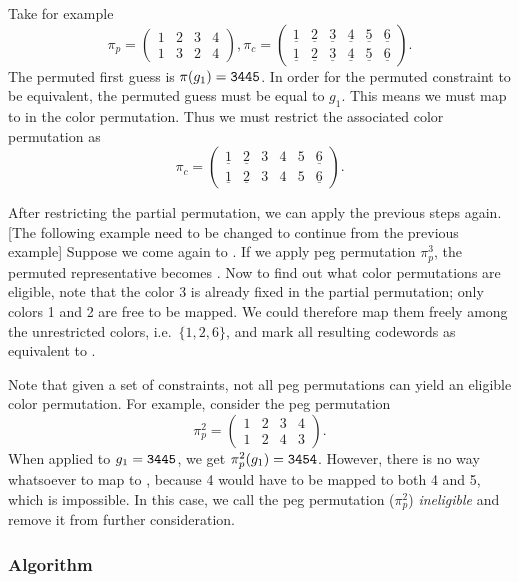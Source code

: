 Take for example 
\[
\pi_p = 
\begin{pmatrix}
1 & 2 & 3 & 4 \\
1 & 3 & 2 & 4
\end{pmatrix} , 
\pi_c = 
\begin{pmatrix}
\underline{1} & \underline{2} & \underline{3} & \underline{4} & \underline{5} & \underline{6} \\
\underline{1} & \underline{2} & \underline{3} & \underline{4} & \underline{5} & \underline{6} 
\end{pmatrix} .
\] 
The permuted first guess is $\pi(g_1) = \texttt{3445}$. In order for the permuted constraint to be equivalent, the permuted guess must be equal to $g_1$. This means we must map  to  in the color permutation. Thus we must restrict the associated color permutation as
\[
\pi_c = 
\begin{pmatrix}
\underline{1} & \underline{2} & 3 & 4 & 5 & \underline{6} \\
\underline{1} & \underline{2} & 3 & 4 & 5  & \underline{6} 
\end{pmatrix} .
\]

After restricting the partial permutation, we can apply the previous steps again. 
[The following example need to be changed to continue from the previous example] Suppose we come again to . If we apply peg permutation $\pi_p^3$, the permuted representative becomes . Now to find out what color permutations are eligible, note that the color 3 is already fixed in the partial permutation; only colors 1 and 2 are free to be mapped. We could therefore map them freely among the unrestricted colors, i.e.\ $\{1, 2, 6\}$, and mark all resulting codewords as equivalent to .

Note that given a set of constraints, not all peg permutations can yield an eligible color permutation. For example, consider the peg permutation
\[
\pi_p^2 = 
\begin{pmatrix}
1 & 2 & 3 & 4 \\
1 & 2 & 4 & 3
\end{pmatrix} .
\]
When applied to $g_1 = \texttt{3445}$, we get $\pi_p^2(g_1) = \texttt{3454}$. However, there is no way whatsoever to map  to , because 4 would have to be mapped to both 4 and 5, which is impossible. In this case, we call the peg permutation ($\pi_p^2$) \emph{ineligible} and remove it from further consideration.

\subsubsection{Algorithm}

